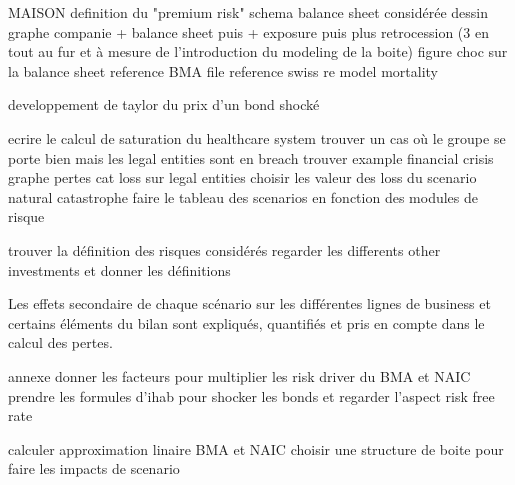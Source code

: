 MAISON
definition du "premium risk"
schema balance sheet considérée
dessin graphe companie + balance sheet puis + exposure puis plus retrocession (3 en tout au fur et à mesure de l'introduction du modeling de la boite)
figure choc sur la balance sheet
reference BMA file
reference swiss re model mortality

developpement de taylor du prix d'un bond shocké


ecrire le calcul de saturation du healthcare system
trouver un cas où le groupe se porte bien mais les legal entities sont en breach
trouver example financial crisis
graphe pertes cat loss sur legal entities
choisir les valeur des loss du scenario natural catastrophe
faire le tableau des scenarios en fonction des modules de risque 

trouver la définition des risques considérés
regarder les differents other investments et donner les définitions


Les effets secondaire de chaque scénario sur les différentes lignes de business et certains éléments du bilan sont expliqués, quantifiés et pris en compte dans le calcul des pertes.

annexe donner les facteurs pour multiplier les risk driver du BMA et NAIC
prendre les formules d'ihab pour shocker les bonds et regarder l'aspect risk free rate

calculer approximation linaire BMA et NAIC
choisir une structure de boite pour faire les impacts de scenario